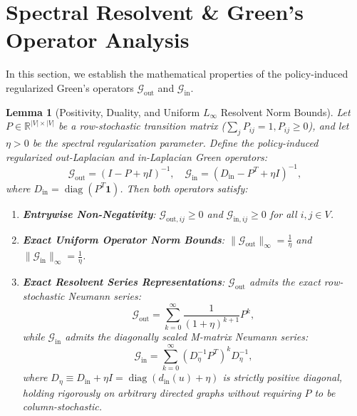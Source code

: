 \documentclass[11pt,a4paper]{article}
\newtheorem{lemma}{Lemma}
\begin{document}
\section{Spectral Resolvent \& Green's Operator Analysis}
\label{sec:appendix_spectral}

In this section, we establish the mathematical properties of the policy-induced regularized Green's operators $\mathcal{G}_{\text{out}}$ and $\mathcal{G}_{\text{in}}$.

\begin{lemma}[Positivity, Duality, and Uniform $L_\infty$ Resolvent Norm Bounds]
\label{lem:green_norm}
Let $P \in \mathbb{R}^{|V| \times |V|}$ be a row-stochastic transition matrix ($\sum_j P_{ij} = 1, P_{ij} \ge 0$), and let $\eta > 0$ be the spectral regularization parameter. Define the policy-induced regularized out-Laplacian and in-Laplacian Green operators:
\begin{equation}
\mathcal{G}_{\text{out}} = (I - P + \eta I)^{-1}, \quad \mathcal{G}_{\text{in}} = (D_{\text{in}} - P^T + \eta I)^{-1},
\end{equation}
where $D_{\text{in}} = \operatorname{diag}(P^T \mathbf{1})$. Then both operators satisfy:
\begin{enumerate}
    \item \textbf{Entrywise Non-Negativity}: $\mathcal{G}_{\text{out}, ij} \ge 0$ and $\mathcal{G}_{\text{in}, ij} \ge 0$ for all $i, j \in V$.
    \item \textbf{Exact Uniform Operator Norm Bounds}: $\|\mathcal{G}_{\text{out}}\|_\infty = \frac{1}{\eta}$ and $\|\mathcal{G}_{\text{in}}\|_\infty = \frac{1}{\eta}$.
    \item \textbf{Exact Resolvent Series Representations}: $\mathcal{G}_{\text{out}}$ admits the exact row-stochastic Neumann series:
    \begin{equation}
    \label{eq:g_out_neumann}
    \mathcal{G}_{\text{out}} = \sum_{k=0}^\infty \frac{1}{(1 + \eta)^{k+1}} P^k,
    \end{equation}
    while $\mathcal{G}_{\text{in}}$ admits the diagonally scaled M-matrix Neumann series:
    \begin{equation}
    \label{eq:g_in_neumann}
    \mathcal{G}_{\text{in}} = \sum_{k=0}^\infty (D_\eta^{-1} P^T)^k D_\eta^{-1},
    \end{equation}
    where $D_\eta \equiv D_{\text{in}} + \eta I = \operatorname{diag}(d_{\text{in}}(u) + \eta)$ is strictly positive diagonal, holding rigorously on arbitrary directed graphs without requiring $P$ to be column-stochastic.

\end{enumerate}
\end{lemma}
\end{document}
